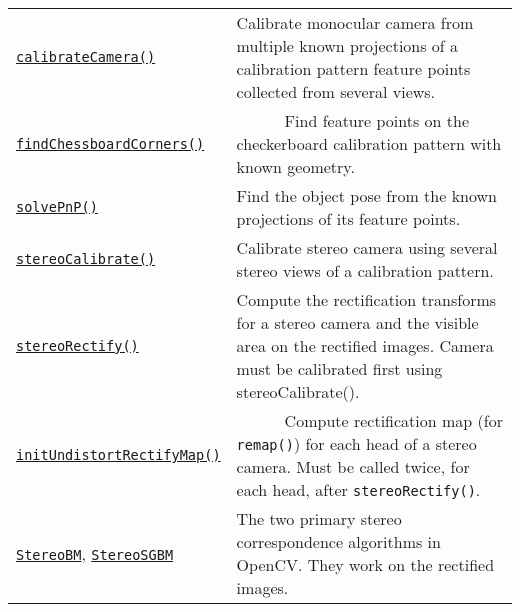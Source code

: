 \documentclass[10pt,landscape]{article}
\begin{document}
\begin{multicols}{3}
\begin{tabular}{@{}p{\the\MyLen}%
                @{}p{\linewidth-\the\MyLen}@{}}

\texttt{\href{http://opencv.willowgarage.com/documentation/cpp/camera_calibration_and_3d_reconstruction.html\#cv-calibratecamera}{calibrateCamera()}} & Calibrate monocular camera from multiple known projections of a calibration pattern feature points collected from several views. \\

\texttt{\href{http://opencv.willowgarage.com/documentation/cpp/camera_calibration_and_3d_reconstruction.html\#cv-findchessboardcorners}{findChessboardCorners()}} & \ \ \ \ \ \ Find feature points on the checkerboard calibration pattern with known geometry. \\

\texttt{\href{http://opencv.willowgarage.com/documentation/cpp/camera_calibration_and_3d_reconstruction.html\#cv-solvepnp}{solvePnP()}} & Find the object pose from the known projections of its feature points. \\

\texttt{\href{http://opencv.willowgarage.com/documentation/cpp/camera_calibration_and_3d_reconstruction.html\#cv-stereocalibrate}{stereoCalibrate()}} & Calibrate stereo camera using several stereo views of a calibration pattern. \\

\texttt{\href{http://opencv.willowgarage.com/documentation/cpp/camera_calibration_and_3d_reconstruction.html\#cv-stereorectify}{stereoRectify()}} & Compute the rectification transforms for a stereo camera and the visible area on the rectified images. Camera must be calibrated first using stereoCalibrate().\\

\texttt{\href{http://opencv.willowgarage.com/documentation/cpp/camera_calibration_and_3d_reconstruction.html\#cv-initundistortrectifymap}{initUndistortRectifyMap()}} & \ \ \ \ \ \ Compute rectification map (for \texttt{remap()}) for each head of a stereo camera. Must be called twice, for each head, after \texttt{stereoRectify()}.\\

\texttt{\href{http://opencv.willowgarage.com/documentation/cpp/camera_calibration_and_3d_reconstruction.html\#cv-StereoBM}{StereoBM}}, \texttt{\href{http://opencv.willowgarage.com/documentation/cpp/camera_calibration_and_3d_reconstruction.html\#cv-StereoSGBM}{StereoSGBM}} & The two primary stereo correspondence algorithms in OpenCV. They work on the rectified images.\\


\end{tabular}
\end{multicols}
\end{document}

